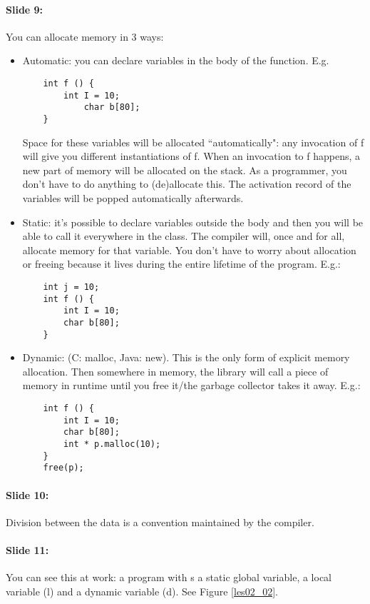 \documentclass[10pt,a4paper]{report}
\begin{document}
\paragraph{Slide 9:} You can allocate memory in 3 ways:
\begin{itemize}
\item Automatic: you can declare variables in the body of the function. E.g.
\begin{verbatim}
	int f () {
	    int I = 10;
	        char b[80];
	}
\end{verbatim}
Space for these variables will be allocated ``automatically": any invocation of f will give you different instantiations of f. When an invocation to f happens, a new part of memory will be allocated on the stack. As a programmer, you don't have to do anything to (de)allocate this. The activation record of the variables will be popped automatically afterwards.
\item Static: it's possible to declare variables outside the body and then you will be able to call it everywhere in the class. The compiler will, once and for all, allocate memory for that variable. You don't have to worry about allocation or freeing because it lives during the entire lifetime of the program. E.g.:
\begin{verbatim}
	int j = 10;
	int f () {
	    int I = 10;
	    char b[80];
	}
\end{verbatim}
\item Dynamic: (C: malloc, Java: new). This is the only form of explicit memory allocation. Then somewhere in memory, the library will call a piece of memory in runtime until you free it/the garbage collector takes it away. E.g.:
\begin{verbatim}
	int f () {
	    int I = 10;    
	    char b[80];    
	    int * p.malloc(10);
	} 
	free(p);
\end{verbatim}
\end{itemize}

\paragraph{Slide 10:} Division between the data is a convention maintained by the compiler.

\paragraph{Slide 11:} You can see this at work: a program with s a static global variable, a local variable (l) and a dynamic variable (d). See Figure \ref{les02_02}.
\end{document}
